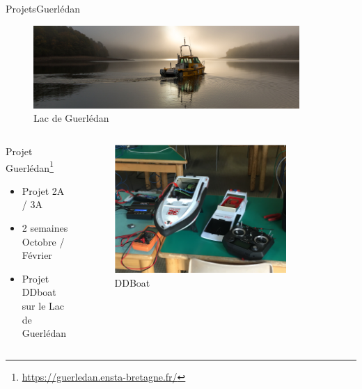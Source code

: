 \begin{frame}{Projets}{Guerlédan}

    \begin{figure}
        \includegraphics[width=0.9\textwidth]{images/project_guerledan/lac.jpg}
        \caption{Lac de Guerlédan}
    \end{figure}
    \vspace{-0.6cm}
    \begin{columns}[t]
        \begin{column}{0.6\textwidth}
            \begin{block}{Projet Guerlédan\footnote{\url{https://guerledan.ensta-bretagne.fr/}}}
                \begin{itemize}
                    \item Projet 2A / 3A \\
                    \item 2 semaines Octobre / Février \\
                    \item Projet DDboat sur le Lac de Guerlédan
                \end{itemize}
                \vfill
            \end{block}
        \end{column}
        \begin{column}{0.38\textwidth}
            \begin{figure}
                \includegraphics[width=0.8\textwidth]{images/project_guerledan/ddboat.png}
                \caption{DDBoat}
            \end{figure}
            \vfill
        \end{column}
    \end{columns}
\end{frame}